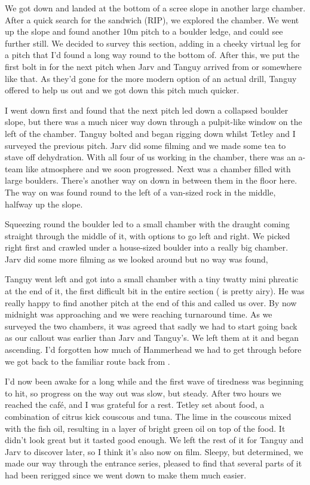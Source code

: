 We got down and landed at the bottom of a scree slope in another large chamber. After a quick search for the sandwich (RIP), we explored the chamber. We went up the slope and found another 10m pitch to a boulder ledge, and could see further still.  We decided to survey this section, adding in a cheeky virtual leg for a pitch that I’d found a long way round to the bottom of. After this, we put the first bolt in for the next pitch when Jarv and Tanguy arrived from  or somewhere like that. As they’d gone for the more modern option of an actual drill, Tanguy offered to help us out and we got down this pitch much quicker. 

I went down first and found that the next pitch led down a collapsed boulder slope, but there was a much nicer way down through a pulpit-like window on the left of the chamber. Tanguy bolted and began rigging down whilst Tetley and I surveyed the previous pitch. Jarv did some filming and we made some tea to stave off dehydration. With all four of us working in the chamber, there was an a-team like atmosphere and we soon progressed. Next was a chamber filled with large boulders. There’s another way on down in between them in the floor here. The way on was found round to the left of a van-sized rock in the middle, halfway up the slope.

Squeezing round the boulder led to a small chamber with the draught coming straight through the middle of it, with options to go left and right. We picked right first and crawled under a house-sized boulder into a really big chamber. Jarv did some more filming as we looked around but no way was found,  

Tanguy went left and got into a small chamber with a tiny twatty mini phreatic at the end of it, the first difficult bit in the entire section ( is pretty airy). He was really happy to find another pitch at the end of this and called us over. By now midnight was approaching and we were reaching turnaround time. As we surveyed the two chambers, it was agreed that sadly we had to start going back as our callout was earlier than Jarv and Tanguy’s. We left them at it and began ascending. I’d forgotten how much of Hammerhead we had to get through before we got back to the familiar route back from .

I’d now been awake for a long while and the first wave of tiredness was beginning to hit, so progress on the way out was slow, but steady. After two hours we reached the café, and I was grateful for a rest. Tetley set about food, a combination of citrus kick couscous and tuna. The lime in the couscous mixed with the fish oil, resulting in a layer of bright green oil on top of the food. It didn’t look great but it tasted good enough. We left the rest of it for Tanguy and Jarv to discover later, so I think it’s also now on film.  Sleepy, but determined, we made our way through the entrance series, pleased to find that several parts of it had been rerigged since we went down to make them much easier. 

